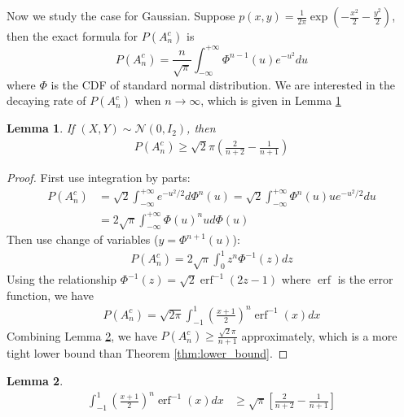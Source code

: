 \documentclass{article}
\newtheorem{lemma}{Lemma}
\DeclareMathOperator{\erf}{erf}
\begin{document}
Now we study the case for Gaussian.
Suppose $p(x,y)=\frac{1}{2\pi}\exp(-\frac{x^2}{2}
-\frac{y^2}{2})$,
then the exact formula for $P(A_n^c)$
is
\begin{equation}\label{eq:gaussian_2d}
    P(A_n^c) = \frac{n}{\sqrt{\pi}} \int_{-\infty}^{+\infty}
    \Phi^{n-1}(u)e^{-u^2}du
\end{equation}
where $\Phi$ is the CDF of standard normal distribution.
We are interested in the decaying rate of $P(A_n^c)$
when $n\to \infty$, which is given in Lemma \ref{lem:gaussian}
\begin{lemma}\label{lem:gaussian}
If $(X,Y)\sim \mathcal{N}(0, I_2)$, then
\begin{align*}
P(A_n^c )\geq  \sqrt{2}\pi \left(\frac{2}{n+2}
-\frac{1}{n+1}
\right)
\end{align*}
\end{lemma}
\begin{proof}


First use integration by parts:
\begin{align*}
    P(A_n^c) &= \sqrt{2} \int_{-\infty}^{+\infty}
    e^{-u^2/2}d\Phi^n(u)
    =\sqrt{2} \int_{-\infty}^{+\infty}\Phi^n(u)
    ue^{-u^2/2}du \\
    &=2\sqrt{\pi} \int_{-\infty}^{+\infty}
    \Phi(u)^n ud\Phi(u)
\end{align*}
Then use change of variables ($y=\Phi^{n+1}(u)$):
\begin{align*}
    P(A_n^c) 
    =2\sqrt{\pi} \int_{0}^{1}z^n \Phi^{-1}(z)dz
\end{align*}
Using the relationship
$\Phi^{-1}(z)
= \sqrt{2} \erf^{-1}(2z-1)$
where $\erf$ is the error function,
we have
\begin{align*}
    P(A_n^c) 
    =\sqrt{2\pi} \int_{-1}^{1}
    \left(\frac{x+1}{2} \right)^n
    \erf^{-1} (x)dx
\end{align*}
Combining Lemma \ref{lem:bound_erf_integral},
we have $P(A_n^c) \geq  \frac{\sqrt{2}\pi}{n+1}$
approximately, which is a more tight lower bound than
Theorem \ref{thm:lower_bound}.
\end{proof}
\begin{lemma}\label{lem:bound_erf_integral}
    \begin{align}\label{eq:bound_erf_integral}
        \int_{-1}^{1}
    \left(\frac{x+1}{2} \right)^n
    \erf^{-1} (x)dx & \geq \sqrt{\pi}
    \left[\frac{2}{n+2} - \frac{1}{n+1}\right]
    \end{align}
\end{lemma}
\end{document}
